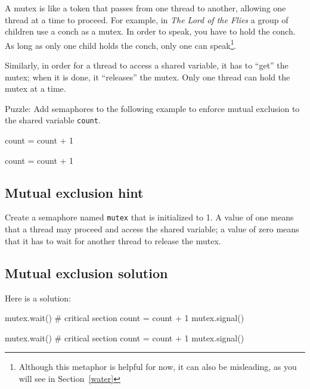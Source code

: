 \documentclass{book}
\begin{document}
A mutex is like a token that passes from one thread to another,
allowing one thread at a time to proceed.  For example, in {\em The
        Lord of the Flies} a group of children use a conch as a mutex.  In
order to speak, you have to hold the conch.  As long as only one child
holds the conch, only one can speak\footnote{Although this metaphor
    is helpful for now, it can also be misleading, as you will see in
    Section~\ref{water}}.

Similarly, in order for a thread to access a shared variable,
it has to ``get'' the mutex; when it is done, it ``releases''
the mutex.  Only one thread can hold the mutex at a time.

Puzzle: Add semaphores to the following example to
enforce mutual exclusion to the shared variable {\tt count}.

\begin{minipage}[t]{0.4\textwidth}
    \begin{unbreakable}[title={Thread A}]{}
count = count + 1
\end{unbreakable}
\end{minipage}
\hfill
\begin{minipage}[t]{0.4\textwidth}
    \begin{unbreakable}[title={Thread B}]{}
count = count + 1
\end{unbreakable}
\end{minipage}



\subsection{Mutual exclusion hint}

Create a semaphore named {\tt mutex} that is initialized
to 1.  A value of one means that a thread may proceed and
access the shared variable; a value of zero means that it
has to wait for another thread to release the mutex.



\subsection{Mutual exclusion solution}

Here is a solution:

\begin{minipage}[t]{0.42\textwidth}
    \begin{unbreakable}[basicstyle=\scriptsize,title={Thread A}]{}
mutex.wait()
 # critical section
 count = count + 1
mutex.signal()
\end{unbreakable}
\end{minipage}
\hfill
\begin{minipage}[t]{0.42\textwidth}
    \begin{unbreakable}[basicstyle=\scriptsize,title={Thread B}]{}
mutex.wait()
 # critical section
 count = count + 1
mutex.signal()
\end{unbreakable}
\end{minipage}
\end{document}
